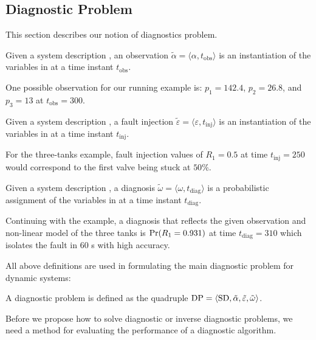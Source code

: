 \subsection{Diagnostic Problem}

This section describes our notion of diagnostics problem.
%
\begin{definition}[Observation]
%
Given a system description \sd, an observation $\tilde\alpha =
\langle\alpha, t_{\mathrm{obs}}\rangle$ is an instantiation of the
variables in \obs at a time instant $t_{\mathrm{obs}}$.
%
\end{definition}
%
One possible observation for our running example is:
$p_1 = 142.4$, $p_2 = 26.8$, and $p_3 = 13$ at $t_{\mathrm{obs}} =
300$.
%
\begin{definition}
%
Given a system description \sd, a fault injection $\tilde{\varepsilon}
= \langle\varepsilon, t_{\mathrm{inj}}\rangle$ is an instantiation of
the variables in \comps at a time instant $t_{\mathrm{inj}}$.
%
\end{definition}
%
For the three-tanks example, fault injection values of $R_1 = 0.5$ at
time $t_{\mathrm{inj}} = 250$ would correspond to the first valve
being stuck at $50\%$.
%
\begin{definition}[Diagnosis]\label{def:diagnosis}
%
Given a system description \sd, a diagnosis $\tilde{\omega} =
\langle\omega, t_{\mathrm{diag}}\rangle$ is a probabilistic assignment
of the variables in \comps at a time instant $t_{\mathrm{diag}}$.
%
\end{definition}
%
Continuing with the example, a diagnosis that reflects the given
observation and non-linear model of the three tanks is $\mathrm{Pr}(R_1 =
0.931)$ at time $t_{\mathrm{diag}} = 310$ which isolates the fault in
$60$ s with high accuracy.
\par
All above definitions are used in formulating the main diagnostic
problem for dynamic systems:
%
\begin{definition}
%
A diagnostic problem \dproblem is defined as the quadruple $\mathrm{DP}
= \langle\mathrm{SD}, \tilde{\alpha}, \tilde{\varepsilon},
\tilde{\omega}\rangle$.
%
\end{definition}
%
Before we propose how to solve diagnostic or inverse diagnostic
problems, we need a method for evaluating the performance of a
diagnostic algorithm.
%
